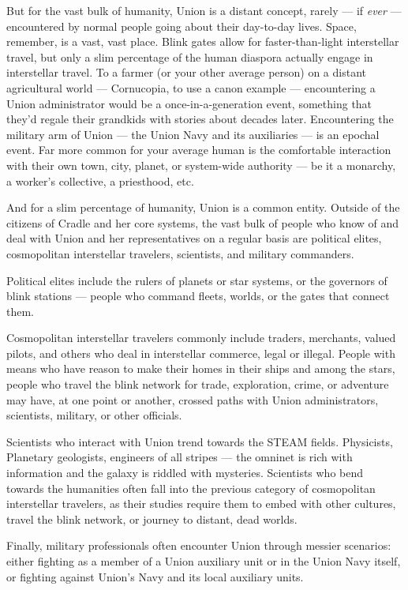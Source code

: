 But for the vast bulk of humanity, Union is a distant concept, rarely — if \textit{ever} — encountered by
normal people going about their day-to-day lives. Space, remember, is a vast, vast place. Blink
gates allow for faster-than-light interstellar travel, but only a slim percentage of the human
diaspora actually engage in interstellar travel. To a farmer (or your other average person) on a
distant agricultural world — Cornucopia, to use a canon example — encountering a Union
administrator would be a once-in-a-generation event, something that they'd regale their
grandkids with stories about decades later. Encountering the military arm of Union — the Union
Navy and its auxiliaries — is an epochal event. Far more common for your average human is the
comfortable interaction with their own town, city, planet, or system-wide authority — be it a
monarchy, a worker's collective, a priesthood, etc.

And for a slim percentage of humanity, Union is a common entity. Outside of the citizens of
Cradle and her core systems, the vast bulk of people who know of and deal with Union and her
representatives on a regular basis are political elites, cosmopolitan interstellar travelers,
scientists, and military commanders.

Political elites include the rulers of planets or star systems, or the governors of blink stations —
people who command fleets, worlds, or the gates that connect them.

Cosmopolitan interstellar travelers commonly include traders, merchants, valued pilots, and
others who deal in interstellar commerce, legal or illegal. People with means who have reason to
make their homes in their ships and among the stars, people who travel the blink network for
trade, exploration, crime, or adventure may have, at one point or another, crossed paths with
Union administrators, scientists, military, or other officials.

Scientists who interact with Union trend towards the STEAM fields. Physicists, Planetary
geologists, engineers of all stripes — the omninet is rich with information and the galaxy is
riddled with mysteries. Scientists who bend towards the humanities often fall into the previous
category of cosmopolitan interstellar travelers, as their studies require them to embed with other
cultures, travel the blink network, or journey to distant, dead worlds.

Finally, military professionals often encounter Union through messier scenarios: either fighting as
a member of a Union auxiliary unit or in the Union Navy itself, or fighting against Union's Navy
and its local auxiliary units.

